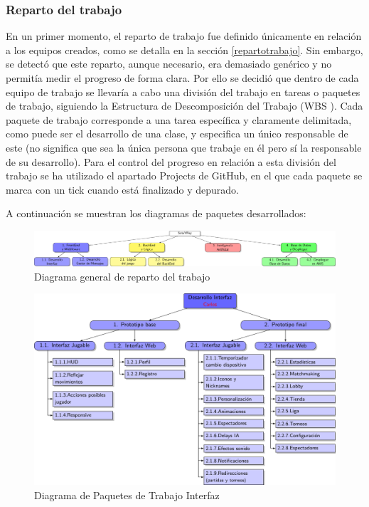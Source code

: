 \subsubsection{Reparto del trabajo}
En un primer momento, el reparto de trabajo fue definido únicamente en relación a los equipos creados, como se detalla en la sección \ref{repartotrabajo}. Sin embargo, se detectó que este reparto, aunque necesario, era demasiado genérico y no permitía medir el progreso de forma clara. Por ello se decidió que dentro de cada equipo de trabajo se llevaría a cabo una división del trabajo en tareas o paquetes de trabajo, siguiendo la Estructura de Descomposición del Trabajo (WBS \cite{edt}). Cada paquete de trabajo corresponde a una tarea específica y claramente delimitada, como puede ser el desarrollo de una clase, y especifica un único responsable de este (no significa que sea la única persona que trabaje en él pero sí la responsable de su desarrollo). Para el control del progreso en relación a esta división del trabajo se ha utilizado el apartado Projects de GitHub, en el que cada paquete se marca con un tick cuando está finalizado y depurado.

A continuación se muestran los diagramas de paquetes desarrollados:

\begin{figure}[H]
		\hspace{-2cm}
		\includegraphics[scale=0.6]{figuras/edtGeneral.pdf}
		\caption{Diagrama general de reparto del trabajo}
	\end{figure}

\begin{figure}[H]
		\centering
		\includegraphics[scale=0.85]{figuras/edtInterfaz.pdf}
		\caption{Diagrama de Paquetes de Trabajo Interfaz}
	\end{figure}

